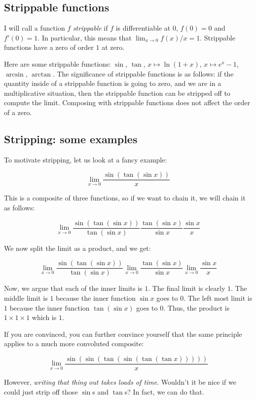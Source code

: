 \documentclass[10pt]{amsart}
\begin{document}
\subsection{Strippable functions}
I will call a function $f$ {\em strippable} if $f$ is differentiable
at $0$, $f(0) = 0$ and $f'(0) = 1$. In particular, this means that
$\lim_{x \to 0} f(x)/x = 1$. Strippable functions have a zero of order
$1$ at zero.

Here are some strippable functions: $\sin$, $\tan$, $x \mapsto \ln(1 +
x)$, $x \mapsto e^x - 1$, $\arcsin$, $\arctan$. The significance of
strippable functions is as follows: if the quantity inside of a
strippable function is going to zero, and we are in a multiplicative
situation, then the strippable function can be stripped off to compute
the limit. Composing with strippable functions does not affect the
order of a zero.

\subsection{Stripping: some examples}

To motivate stripping, let us look at a fancy example:

$$\lim_{x \to 0} \frac{\sin(\tan(\sin x))}{x}$$

This is a composite of three functions, so if we want to chain it, we
will chain it as follows:

$$\lim_{x \to 0} \frac{\sin(\tan(\sin x))}{\tan(\sin x)}\frac{\tan(\sin x)}{\sin x}\frac{\sin x}{x}$$

We now split the limit as a product, and we get:

$$\lim_{x \to 0} \frac{\sin(\tan(\sin x))}{\tan(\sin x)}\lim_{x \to 0} \frac{\tan(\sin x)}{\sin x}\lim_{x \to 0} \frac{\sin x}{x}$$

Now, we argue that each of the inner limits is $1$. The final limit is
clearly $1$. The middle limit is $1$ because the inner function $\sin
x$ goes to $0$. The left most limit is $1$ because the inner function
$\tan(\sin x)$ goes to $0$. Thus, the product is $1 \times 1 \times 1$
which is $1$.

If you are convinced, you can further convince yourself that the same
principle applies to a much more convoluted composite:

$$\lim_{x \to 0} \frac{\sin(\sin(\tan(\sin(\tan(\tan x)))))}{x}$$

However, {\em writing that thing out takes loads of time}. Wouldn't it
be nice if we could just strip off those $\sin$s and $\tan$s? In fact,
we can do that.
\end{document}
